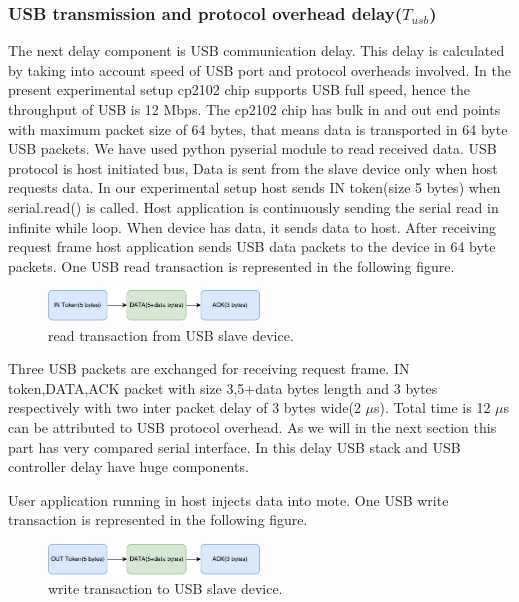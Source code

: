 \subsubsection{USB transmission and protocol overhead delay($T_{usb}$)}
The next delay component is USB communication delay. This delay is calculated by taking into account speed of USB port and protocol overheads involved.
In the present experimental setup cp2102 chip supports USB full speed, hence the throughput of USB is 12 Mbps.
The cp2102 chip has bulk in and out end points with maximum packet size of 64 bytes, that means data is transported in 64 byte USB packets.
We have used python pyserial module to read received data.
USB protocol is host initiated bus, Data is sent from the slave device only when host requests data.
In our experimental setup host sends IN token(size 5 bytes) when serial.read() is called.
Host application is continuously sending the serial read in infinite while loop.
When device has data, it sends data to host.
After receiving request frame host application sends USB data packets to the device in 64 byte packets.
One USB read transaction is represented in the following figure.\cite{Craig.Peacock@beyondlogic.org}

\begin{figure}[h]
	\includegraphics[width=0.5\textwidth,center]{read_trans.pdf}
	\caption{read transaction from USB slave device.}
	\label{fig:read_trans}
\end{figure}

Three USB packets are exchanged for receiving request frame.
IN token,DATA,ACK packet with size 3,5+data bytes length and 3 bytes respectively with two inter packet delay of 3 bytes wide(2 $\mu$s). 
Total time is 12 $\mu$s can be attributed to USB protocol overhead. As we will in the next section this part has very compared serial interface. In this delay USB stack and USB controller delay have huge components.

User application running in host injects data into mote.  One USB write transaction is represented in the following figure.

\begin{figure}[h]
	\includegraphics[width=0.5\textwidth,center]{out_trans.pdf}
	\caption{write transaction to USB slave device.}
	\label{fig:write_trans}
\end{figure}

